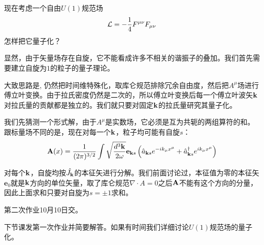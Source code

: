 \documentclass[CJK]{beamer}
\begin{document}
\begin{frame}
\bch
现在考虑一个自由$U(1)$规范场
$${\mathcal{L}} = -\frac{1}{4}{F^{\mu\nu}}{F_{\mu\nu}}$$
怎样把它量子化？

\skipline
显然，由于矢量场存在自旋，它不能看成许多不相关的谐振子的叠加。我们首先需要建立自旋为$1$的粒子的量子理论。

大致思路是, 仍然把时间维特殊化，取库仑规范排除冗余自由度，然后把$A^\mu$场进行傅立叶变换。由于拉氏密度仍然是二次的，所以傅立叶变换后每一个傅立叶波矢${\mathbf{k}}$对拉氏量的贡献都是独立的。我们就只要对固定${\mathbf{k}}$的拉氏量研究其量子化。

\ech
\end{frame}

\begin{frame}
\bch
我们先猜测一个形式解，由于$A^\mu$是实数场，它必须是互为共轭的两组算符的和。跟标量场不同的是，现在对每一个${\mathbf{k}}$，粒子均可能有自旋$s$：
$${\mathbf{A}}(x) = \frac{1}{(2\pi)^{3/2}} \int \sqrt{\frac{d^3{\mathbf{k}}}{2\omega}} \mathbf{e}_{{\mathbf{k}} s}\left({\hat{a}}_{{\mathbf{k}} s} e^{-ik_\mu x^\mu} + {\hat{a}^\dagger}_{{\mathbf{k}} s}e^{ik_\mu x^\mu}\right) $$

对每个${\mathbf{k}}$，自旋均按$\hat{J_{\mathbf{k}}}$的本征矢进行分解。我们前面讨论过，本征值为零的本征矢$\mathbf{e}_0$就是${\mathbf{k}}$方向的单位矢量，取了库仑规范$\nabla\cdot A=0$之后${\mathbf{A}}$不能有这个方向的分量，因此上面求和只要对自旋为$s=\pm 1$求和。
\ech
\end{frame}

\begin{frame}
\bch
第二次作业10月10日交。

\skipline
下节课发第一次作业并简要解答。如果有时间我们详细讨论$U(1)$规范场的量子化。
\ech
\end{frame}
\end{document}
